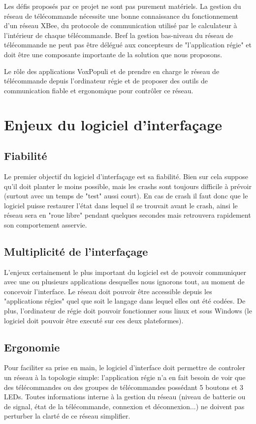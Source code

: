 \documentclass{Rapport}
\begin{document}

Les défis proposés par ce projet ne sont pas purement matériels. La gestion du réseau de télécommande nécessite une bonne connaissance du fonctionnement d'un réseau XBee, du protocole de communication utilisé par le calculateur à l'intérieur de chaque télécommande. Bref la gestion bas-niveau du réseau de télécommande ne peut pas être délégué aux concepteurs de "l'application régie" et doit être une composante importante de la solution que nous proposons. 

Le rôle des applications VoxPopuli et de prendre en charge le réseau de télécommande depuis l'ordinateur régie et de proposer des outils de communication fiable et ergonomique pour contrôler ce réseau.

\section{Enjeux du logiciel d'interfaçage}

\subsection*{Fiabilité}
Le premier objectif du logiciel d'interfaçage est sa fiabilité. Bien sur cela suppose qu'il doit planter le moins possible, mais les crashs sont toujours difficile à prévoir (surtout avec un temps de "test" aussi court). En cas de crash il faut donc que le logiciel puisse restaurer l'état dans lequel il se trouvait avant le crash, ainsi le réseau sera en "roue libre" pendant quelques secondes mais retrouvera rapidement son comportement asservie.

\subsection*{Multiplicité de l'interfaçage}
L'enjeux certainement le plus important du logiciel est de pouvoir communiquer avec une ou plusieurs applications desquelles nous ignorons tout, au moment de concevoir l'interface. Le réseau doit pouvoir être accessible depuis les "applications régies" quel que soit le langage dans lequel elles ont été codées. De plus, l'ordinateur de régie doit pouvoir fonctionner sous linux et sous Windows (le logiciel doit pouvoir être executé sur ces deux plateformes).

\subsection*{Ergonomie}
Pour faciliter sa prise en main, le logiciel d'interface doit permettre de controler un réseau à la topologie simple: l'application régie n'a en fait besoin de voir que des télécommandes ou des groupes de télécommandes possédant 5 boutons et 3 LEDs. Toutes informations interne à la gestion du réseau (niveau de batterie ou de signal, état de la télécommande, connexion et déconnexion...) ne doivent pas perturber la clarté de ce réseau simplifier.
\end{document}
